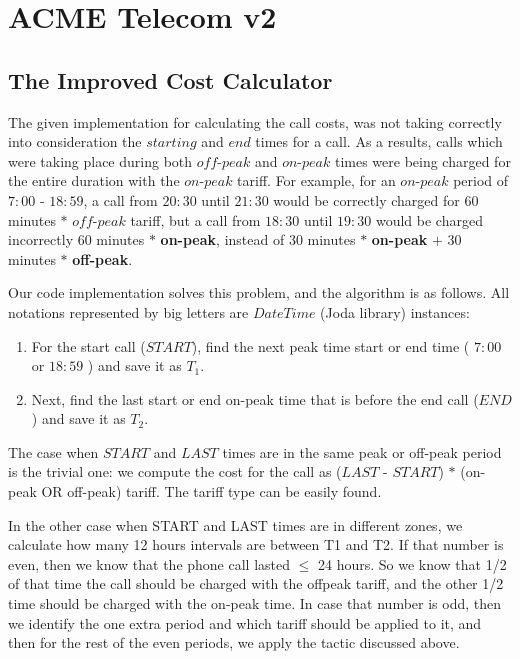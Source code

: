 \documentclass[11pt,twocolumn]{article} %
\begin{document}
\section{ACME Telecom v2}

\subsection{The Improved Cost Calculator}

The given implementation for calculating the call costs, was not taking correctly into consideration 
the $starting$ and $end$ times for a call. As a results, calls which were taking place during both $off$-$peak$ and 
$on$-$peak$ times were being charged for the entire duration with the $on$-$peak$ tariff. For example, for an $on$-$peak$
period of $7:00$ - $18:59$, a call from $20:30$ until $21:30$ would be correctly charged for $60$ minutes $\ast$
$off$-$peak$ tariff, but a call from  $18:30$ until $19:30$ would be charged incorrectly $60$ minutes $\ast$ \textbf{on-peak},
instead of $30$ minutes $\ast$ \textbf{on-peak} $+$ 30 minutes $\ast$ \textbf{off-peak}.

Our code implementation solves this problem, and the algorithm is as follows. All notations represented by big letters 
are $DateTime$ (Joda library) instances:
\begin{enumerate}
\item{For the start call ($START$), find the next peak time start or end time ( $7:00$ or $18:59$ ) and save it as $T_1$.}

\item{Next, find the last start or end on-peak time that is before the end call ($END$) and save it as $T_2$.}
\end{enumerate}

The case when $START$ and $LAST$ times are in the same peak or off-peak period is the trivial one: we compute the 
cost for the call as ($LAST$ - $START$) $\ast$ (on-peak OR off-peak) tariff. The tariff type can be easily found. 

In the other case when START and LAST times are in different zones, we calculate how many 12 hours intervals are between T1 and T2.
If that number is even, then we know that the phone call lasted $\leq$ 24 hours. So we know that 1/2 of that time the call should be 
charged with the offpeak tariff, and the other 1/2 time should be charged with the on-peak time. 
In case that number is odd, then we identify the one extra period and which tariff should be applied to it, and then for the rest of the 
even periods, we apply the tactic discussed above. 
\end{document}
